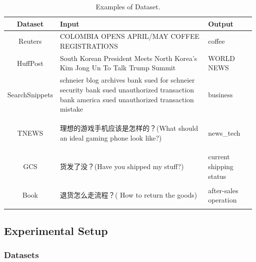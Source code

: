\begin{table}[th]
	\scriptsize
	\centering
	\begin{tabular}{c P{11cm}P{3cm}}
	\hline
	Dataset & Input     &      Output          \\ \hline
	Reuters     & COLOMBIA OPENS APRIL/MAY COFFEE REGISTRATIONS & coffee         \\ 
	HuffPost &South Korean President Meets North Korea's Kim Jong Un To Talk Trump Summit &WORLD NEWS\\ 
	SearchSnippets & schneier blog archives bank sued for schneier security bank sued unauthorized transaction bank america sued unauthorized transaction mistake & business\\ 
	TNEWS & \begin{CJK}{UTF8}{gbsn}理想的游戏手机应该是怎样的？(What should an ideal gaming phone look like?)\end{CJK} & news\_tech \\ 
	GCS     & \begin{CJK}{UTF8}{gbsn}货发了没？(Have you shipped my stuff?)\end{CJK} &  current shipping status      \\ 
	Book & \begin{CJK}{UTF8}{gbsn}退货怎么走流程？(
		How to return the goods)\end{CJK}	&  after-sales operation \\ \hline
	
	\end{tabular}
	\caption{Examples of Dataset.}
	\label{table:exampleOfDataset}
	\end{table}

\subsection{Experimental Setup}
\subsubsection{Datasets} 

